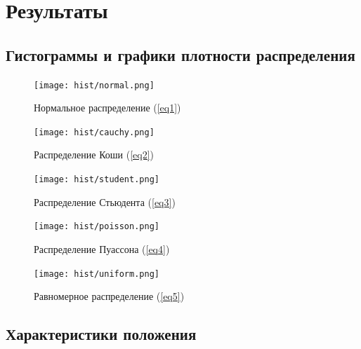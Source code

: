 
\section{Результаты}
\subsection{Гистограммы и графики плотности распределения}
\begin{figure}[H]
    \centering
    \texttt{[image: hist/normal.png]}
    \caption{Нормальное распределение (\ref{eq1})}
    \label{fig1}
\end{figure}

\begin{figure}[H]
    \centering
    \texttt{[image: hist/cauchy.png]}
    \caption{Распределение Коши (\ref{eq2})}
    \label{fig2}
\end{figure}

\begin{figure}[H]
    \centering
    \texttt{[image: hist/student.png]}
    \caption{Распределение Стьюдента (\ref{eq3})}
    \label{fig3}
\end{figure}

\begin{figure}[H]
    \centering
    \texttt{[image: hist/poisson.png]}
    \caption{Распределение Пуассона (\ref{eq4})}
    \label{fig4}
\end{figure}

\begin{figure}[H]
    \centering
    \texttt{[image: hist/uniform.png]}
    \caption{Равномерное распределение (\ref{eq5})}
    \label{fig5}
\end{figure}

\subsection{Характеристики положения}


